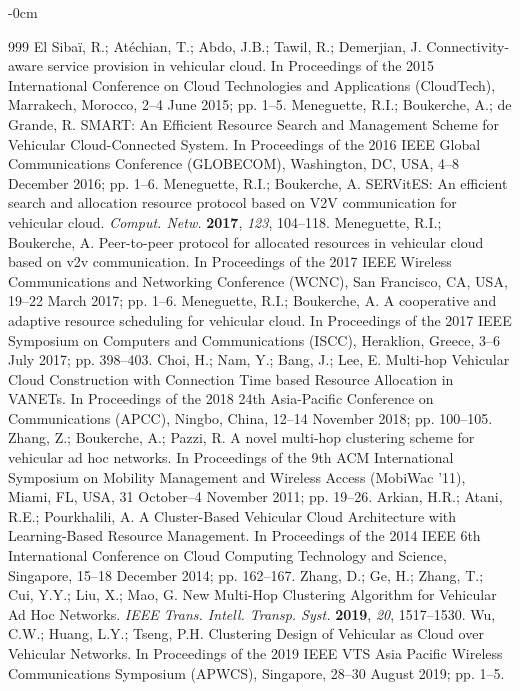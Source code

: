 \documentclass[sensors,article,accept,moreauthors,pdftex]{Definitions/mdpi}
\begin{document}
\begin{adjustwidth}{-\extralength}{0cm}
\begin{thebibliography}{999}
El Sibaï, R.; Atéchian, T.; Abdo, J.B.; Tawil, R.; Demerjian, J. Connectivity-aware service provision in vehicular cloud. In Proceedings of the 2015 International Conference on Cloud Technologies and Applications (CloudTech), Marrakech, Morocco, 2--4 June 2015; pp. 1--5.
Meneguette, R.I.; Boukerche, A.; de Grande, R. SMART: An Efficient Resource Search and Management Scheme for Vehicular Cloud-Connected System. In Proceedings of the 2016 IEEE Global Communications Conference (GLOBECOM), Washington, DC, USA, 4--8 December 2016; pp. 1--6.
Meneguette, R.I.; Boukerche, A. SERVitES: An efficient search and allocation resource protocol based on V2V communication for vehicular cloud. \emph{Comput. Netw.} \textbf{2017}, \emph{123},  104--118.
Meneguette, R.I.; Boukerche, A. Peer-to-peer protocol for allocated resources in vehicular cloud based on v2v communication. In Proceedings of the 2017 IEEE Wireless Communications and Networking Conference (WCNC), San Francisco, CA, USA, 19--22 March 2017; pp. 1--6.
Meneguette, R.I.; Boukerche, A. A cooperative and adaptive resource scheduling for vehicular cloud. In Proceedings of the 2017 IEEE Symposium on Computers and Communications (ISCC), Heraklion, Greece, 3--6 July 2017; pp. 398--403.
Choi, H.; Nam, Y.; Bang, J.; Lee, E. Multi-hop Vehicular Cloud Construction with Connection Time based Resource Allocation in VANETs. In Proceedings of the 2018 24th Asia-Pacific Conference on Communications (APCC), Ningbo, China, 12--14 November 2018; pp. 100--105.
Zhang, Z.; Boukerche, A.; Pazzi, R. A novel multi-hop clustering scheme for vehicular ad hoc networks. In Proceedings of the  9th ACM International Symposium on Mobility Management and Wireless Access (MobiWac '11),  Miami, FL, USA, 31 October--4 November 2011; pp. 19--26.
Arkian, H.R.; Atani, R.E.; Pourkhalili, A. A Cluster-Based Vehicular Cloud Architecture with Learning-Based Resource Management. In Proceedings of the 2014 IEEE 6th International Conference on Cloud Computing Technology and Science, Singapore, 15--18 December 2014; pp. 162--167.
Zhang, D.; Ge, H.; Zhang, T.; Cui, Y.Y.; Liu, X.; Mao, G. New Multi-Hop Clustering Algorithm for Vehicular Ad Hoc Networks. \emph{IEEE Trans. Intell. Transp. Syst.} \textbf{2019}, \emph{20}, 1517--1530.
Wu, C.W.; Huang, L.Y.; Tseng, P.H. Clustering Design of Vehicular as Cloud over Vehicular Networks.  In Proceedings of the 2019 IEEE VTS Asia Pacific Wireless Communications Symposium (APWCS), Singapore, 28--30 August 2019; pp. 1--5.

\end{thebibliography}
\end{adjustwidth}
\end{document}
